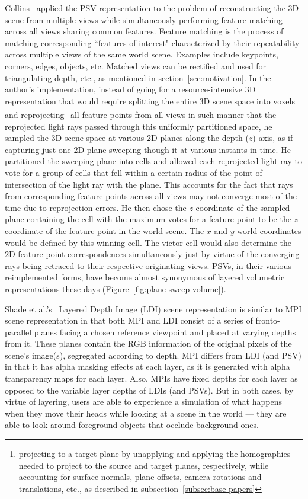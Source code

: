 Collins~\cite{collins_space-sweep_1996} applied the PSV representation to the problem of reconstructing the 3D scene from multiple views while simultaneously performing feature matching across all views sharing common features. Feature matching is the process of matching corresponding ``features of interest" characterized by their repeatability across multiple views of the same world scene. Examples include keypoints, corners, edges, objects, etc. Matched views can be rectified and used for triangulating depth, etc., as mentioned in section~\ref{sec:motivation}. In the author's implementation, instead of going for a resource-intensive 3D representation that would require splitting the entire 3D scene space into voxels and reprojecting\footnote{projecting to a target plane by unapplying and applying the homographies needed to project to the source and target planes, respectively, while accounting for surface normals, plane offsets, camera rotations and translations, etc., as described in subsection~\ref{subsec:base-papers}} all feature points from all views in such manner that the reprojected light rays passed through this uniformly partitioned space, he sampled the 3D scene space at various 2D planes along the depth ($z$) axis, as if capturing just one 2D plane sweeping though it at various instants in time. He partitioned the sweeping plane into cells and allowed each reprojected light ray to vote for a group of cells that fell within a certain radius of the point of intersection of the light ray with the plane. This accounts for the fact that rays from corresponding feature points across all views may not converge most of the time due to reprojection errors. He then chose the $z$-coordinate of the sampled plane containing the cell with the maximum votes for a feature point to be the $z$-coordinate of the feature point in the world scene. The $x$ and $y$ world coordinates would be defined by this winning cell. The victor cell would also determine the 2D feature point correspondences simultaneously just by virtue of the converging rays being retraced to their respective originating views. PSVs, in their various reimplemented forms, have become almost synonymous of layered volumetric representations these days (Figure~\ref{fig:plane-sweep-volume}).

Shade et al.'s~\cite{shade_layered_1998} Layered Depth Image (LDI) scene representation is similar to MPI scene representation in that both MPI and LDI consist of a series of fronto-parallel planes facing a chosen reference viewpoint and placed at varying depths from it. These planes contain the RGB information of the original pixels of the scene's image(s), segregated according to depth. MPI differs from LDI (and PSV) in that it has alpha masking effects at each layer, as it is generated with alpha transparency maps for each layer. Also, MPIs have fixed depths for each layer as opposed to the variable layer depths of LDIs (and PSVs). But in both cases, by virtue of layering, users are able to experience a simulation of what happens when they move their heads while looking at a scene in the world --- they are able to look around foreground objects that occlude background ones. 

